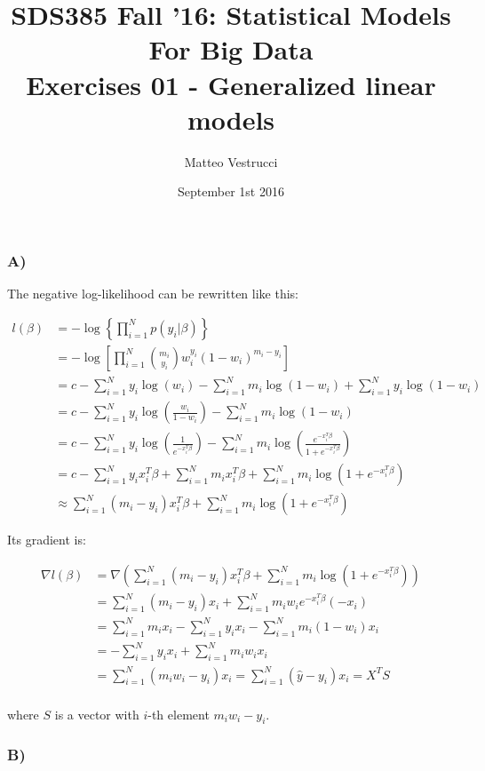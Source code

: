 \documentclass{article}
\title{SDS385 Fall '16: Statistical Models For Big Data\\Exercises 01 - Generalized linear models}
\author{Matteo Vestrucci}
\date{September 1st 2016}
\begin{document}
\maketitle
\bigskip\bigskip\bigskip

\subsubsection*{A)}

The negative log-likelihood can be rewritten like this:

\begin{align*}
l(\beta)&=-\log\left\lbrace\prod_{i=1}^N p(y_i|\beta)\right\rbrace\\
		&=-\log\left[\prod_{i=1}^N \binom{m_i}{y_i}w_i^{y_i}(1-w_i)^{m_i-y_i}\right]\\
		&= c-\sum_{i=1}^N y_i \log(w_i)-\sum_{i=1}^N m_i \log(1-w_i)+\sum_{i=1}^N y_i \log(1-w_i)\\
		&= c-\sum_{i=1}^N y_i \log\left(\frac{w_i}{1-w_i}\right)-\sum_{i=1}^N m_i \log(1-w_i)\\
		&= c-\sum_{i=1}^N y_i \log\left(\frac{1}{e^{-x_i^T\beta}}\right)-\sum_{i=1}^N m_i \log\left(\frac{e^{-x_i^T\beta}}{1+e^{-x_i^T\beta}}\right)\\
		&= c-\sum_{i=1}^N y_i x_i^T\beta+\sum_{i=1}^N m_i x_i^T\beta+\sum_{i=1}^N m_i \log(1+e^{-x_i^T\beta})\\
		&\approx\sum_{i=1}^N (m_i-y_i) x_i^T\beta+\sum_{i=1}^N m_i \log(1+e^{-x_i^T\beta})
\end{align*}

\newpage

Its gradient is:

\begin{align*}
\nabla l(\beta)&=\nabla\left(\sum_{i=1}^N (m_i-y_i) x_i^T\beta+\sum_{i=1}^N m_i \log(1+e^{-x_i^T\beta})\right)\\
				&=\sum_{i=1}^N (m_i-y_i) x_i+\sum_{i=1}^N m_i w_i e^{-x_i^T\beta}(-x_i)\\
				&=\sum_{i=1}^N m_i x_i-\sum_{i=1}^N y_i x_i-\sum_{i=1}^N m_i (1-w_i) x_i\\
				&=-\sum_{i=1}^N y_i x_i+\sum_{i=1}^N m_i w_i x_i\\
				&=\sum_{i=1}^N (m_i w_i-y_i)x_i=\sum_{i=1}^N (\hat{y}-y_i)x_i=X^TS\\
\end{align*}

where $S$ is a vector with $i$-th element $m_i w_i-y_i$.

\subsubsection*{B)}
\end{document}

